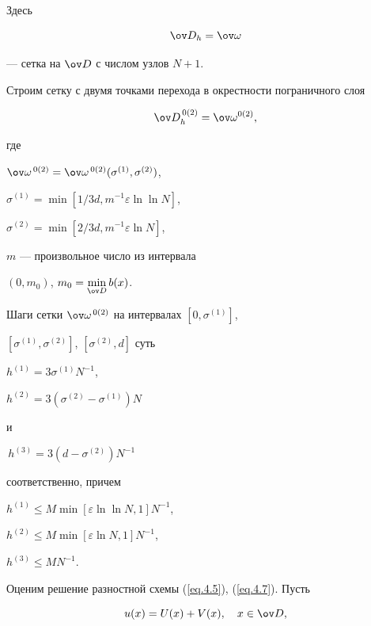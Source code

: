 Здесь 


\begin{equation} \label{eq.4.6}


\ov D_h=\ov\omega


\end{equation}


--- сетка на $\ov D$ с числом узлов $N+1$.





Строим сетку с двумя точками перехода в окрестности пограничного слоя


\begin{equation} \label{eq.4.7}


\ov D_h^{\,0(2)}=\ov\omega^{0(2)},


\end{equation}


где


$\ov\omega^{\,0(2)}=\ov\omega^{\,0(2)}(\sigma^{(1)},\sigma^{(2)})$,


$\sigma^{(1)}=\min[1/3d,m^{-1}\varepsilon\ln\ln N]$,


$\sigma^{(2)}=\min [2/3d, m^{-1}\varepsilon \ln N]$,


$m$ --- произвольное число из интервала


$(0,m_0)$, $m_0=\min\limits_{\ov D} b(x)$.


Шаги сетки $\ov\omega^{\,0(2)}$ на интервалах $[0,\sigma^{(1)}]$,


$[\sigma^{(1)},\sigma^{(2)}]$, $[\sigma^{(2)},d]$ суть


$h^{(1)}=3\sigma^{(1)}N^{-1}$, 


$h^{(2)}=3(\sigma^{(2)}-\sigma^{(1)})N$


и


$\,h^{(3)}=3(d-\sigma^{(2)})N^{-1}$


соответственно, причем


$h^{(1)}\le M \min[\varepsilon\ln\ln N,1]N^{-1}$, 


$h^{(2)}\le M \min[\varepsilon\ln N,1]N^{-1}$,


$h^{(3)}\le MN^{-1}$.





Оценим решение разностной схемы (\ref{eq.4.5}), (\ref{eq.4.7}). Пусть


\begin{equation} \label{eq.4.8}


u(x)=U(x)+V(x), \quad x\in \ov D,


\end{equation}


